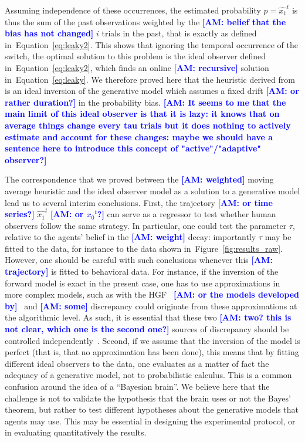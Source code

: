 \documentclass[12pt,english]{article}%
\newcommand{\citep}[1]{\parencite{#1}}
\newcommand{\citet}[1]{\textcite{#1}}
\newcommand{\seeFig}[1]{Figure~\ref{fig:#1}}
\newcommand{\seeEq}[1]{Equation~\ref{eq:#1}}
\newcommand{\AM}[1]{\textbf{\textcolor{blue}{[AM: #1]}}}
\begin{document}
Assuming independence of these occurrences, the estimated probability $p=\hat{x_1}^{t}$ is thus the sum
of the past observations weighted by the \AM{belief that the bias has not changed} $i$ trials in the past, that is exactly
as defined in~\seeEq{leaky2}.
This shows that ignoring the temporal occurrence of the switch,
the optimal solution to this problem is the
ideal observer defined in~\seeEq{leaky2},
which finds an online \AM{recursive} solution in~\seeEq{leaky}.
We therefore proved here that the heuristic derived from~\citet{Anderson2006}
is an ideal inversion of the generative model
which assumes a fixed drift \AM{or rather duration?} in the probability bias. \AM{It seems to me that the main limit of this ideal observer is that it is lazy: it knows that on average things change every tau trials but it does nothing to actively estimate and account for these changes: maybe we should have a sentence here to introduce this concept of "active"/"adaptive" observer?}

The correspondence that we proved between the \AM{weighted} moving average heuristic
and the ideal observer model as a solution to a generative model lead
us to several interim conclusions.
First, the trajectory \AM{or time series?} $\hat{x_1}^{t}$ \AM{or ${x_0}^{t}$?} can serve as a regressor
to test whether human observers follow the same strategy.
In particular, one could test the parameter $\tau$, relative to the agents' belief in the \AM{weight} decay:
importantly $\tau$ may be fitted to the data,
for instance to the data shown in~\seeFig{results_raw}.
However, one should be careful with such conclusions whenever
this \AM{trajectory} is fitted to behavioral data.
For instance, if the inversion of the forward model is exact in the present case,
one has to use approximations in more complex models,
such as with the HGF~\citep{Mathys11} \AM{or the models developed by}~\citet{Wilson13,Wilson18}
and \AM{some} discrepancy could originate from these approximations
at the algorithmic level.
As such, it is essential that these two \AM{two? this is not clear, which one is the second one?} sources of discrepancy
should be controlled independently~\citep{Beck12}.
Second, if we assume that the inversion of the model is perfect
(that is, that no approximation has been done),
this means that by fitting different ideal observers
to the data, one evaluates as a matter of fact the adequacy of
a generative model, not to probabilistic calculus.
This is a common confusion around the idea of a ``Bayesian brain''.
We believe here that the challenge is not to validate the hypothesis that the brain uses or not the Bayes' theorem,
but rather to test different hypotheses about the generative models
that agents may use.
This may be essential in designing the experimental protocol,
or in evaluating quantitatively the results.
\end{document}

